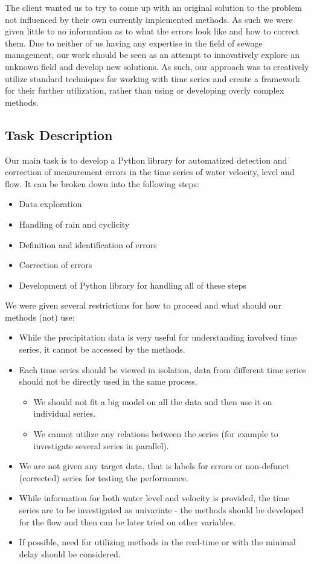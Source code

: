 \documentclass[12pt,a4paper]{article}
\begin{document}
The client wanted us to try to come up with an original solution to the problem not influenced by their own currently implemented methods. As such we were given little to no information as to what the errors look like and how to correct them. Due to neither of us having any expertise in the field of sewage management, our work should be seen as an attempt to innovatively explore an unknown field and develop new solutions. As such, our approach was to creatively utilize standard techniques for working with time series and create a framework for their further utilization, rather than using or developing overly complex methods.


\subsection{Task Description}
Our main task is to develop a Python library for automatized detection and correction of  measurement errors in the time series of water velocity, level and flow. It can be broken down into the following steps:
\begin{itemize}
  \item Data exploration
  \item Handling of rain and cyclicity
  \item Definition and identification of errors
  \item Correction of errors
  \item Development of Python library for handling all of these steps
\end{itemize}

We were given several restrictions for how to proceed and what should our methods (not) use:
\begin{itemize}
    \item While the precipitation data is very useful for understanding involved time series, it cannot be accessed by the methods.
    \item Each time series should be viewed in isolation, data from different time series should not be directly used in the same process.
    \begin{itemize}
      \item{We should not fit a big model on all the data and then use it on individual series.}
      \item{We cannot utilize any relations between the series (for example to investigate several series in parallel).}
      \end{itemize}
      \item {We are not given any target data, that is labels for errors or non-defunct (corrected) series for testing the performance.}
      \item{While information for both water level and velocity is provided, the time series are to be investigated as univariate - the methods should be developed for the flow and then can be later tried on other variables.}
      \item {If possible, need for utilizing methods in the real-time or with the minimal delay should be considered. }
    
\end{itemize}
\end{document}
